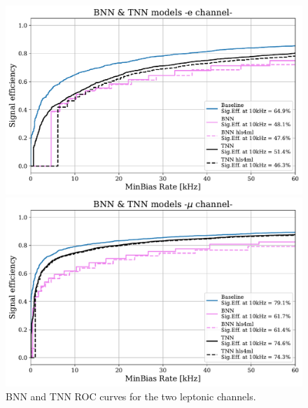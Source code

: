 \documentclass[../../main.tex]{subfiles}
\begin{document}
\begin{figure}[h] 
  \label{ fig7} 
  \begin{minipage}[b]{0.5\linewidth}
    \centering
    \includegraphics[width=.9\linewidth]{sections/05/Images/BTNN_1ele_ROC.pdf} 
    \vspace{4ex}
  \end{minipage}%
  \begin{minipage}[b]{0.5\linewidth}
    \centering
    \includegraphics[width=.9\linewidth]{sections/05/Images/BTNN_1mu_ROC.pdf}
    \vspace{4ex}
  \end{minipage} 
  \caption{BNN and TNN ROC curves for the two leptonic channels.}
  \label{fig:BTNN_models}
\end{figure}


\clearpage
      
\end{document}
